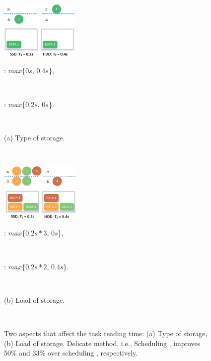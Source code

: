 \documentclass[conference]{IEEEtran}
\begin{document}

\begin{figure}[!t]
\centering
    \begin{minipage}{4.25cm}
        \includegraphics[height = 2.8cm]{fig_example1_8.eps}
        \centerline{\footnotesize{\uppercase\expandafter{} : $max$\{$0s$, $0.4s$\},\quad}}\\
        \centerline{\footnotesize{\uppercase\expandafter{} : $max$\{$0.2s$, $0s$\}.\quad}}\\
         \centerline{(a) Type of storage.}\\
    \end{minipage}
    \begin{minipage}{4.25cm}
        \includegraphics[height = 2.8cm]{fig_example2_6.eps}
        \centerline{\footnotesize{\uppercase\expandafter{} : $max$\{$0.2s*3$, $0s$\},\quad}}\\
        \centerline{\footnotesize{\uppercase\expandafter{} : $max$\{$0.2s*2$, $0.4s$\}.}}\\
         \centerline{(b) Load of storage.\quad}\\
    \end{minipage}
    \vspace{-0.4cm}
    \caption{Two aspects that affect the task reading time: (a) Type of storage, (b) Load of storage. Delicate method, i.e., Scheduling \uppercase\expandafter{}, improves 50\% and 33\% over scheduling \uppercase\expandafter{}, respectively.}
    \label{Fig:example}
    \vspace{-0.4cm}
\end{figure}
\end{document}
